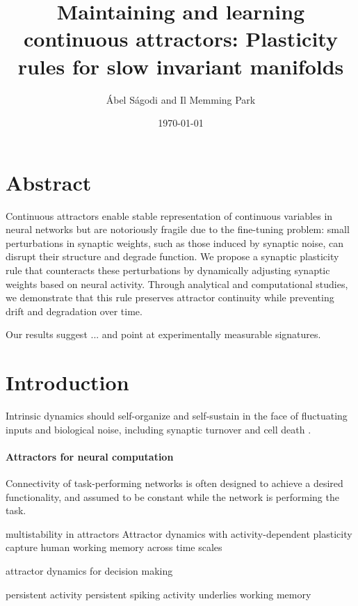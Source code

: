 \documentclass{article}
\title{Maintaining and learning continuous attractors: Plasticity rules for slow invariant manifolds} %
\author{\'Abel S\'agodi and Il Memming Park}
\date{\today}
\theoremstyle{definition} \newtheorem{definition}{Definition}
\theoremstyle{remark} \newtheorem{remark}{Remark}
\newcounter{ct}
\begin{document}
\maketitle

\section*{Abstract}
Continuous attractors enable stable representation of continuous variables in neural networks but are notoriously fragile due to the fine-tuning problem: small perturbations in synaptic weights, such as those induced by synaptic noise, can disrupt their structure and degrade function.
We propose a synaptic plasticity rule that counteracts these perturbations by dynamically adjusting synaptic weights based on neural activity.
Through analytical and computational studies, we demonstrate that this rule preserves attractor continuity while preventing drift and degradation over time.

Our results suggest ...
 and point at experimentally measurable signatures.



\section{Introduction}


Intrinsic dynamics should self-organize and self-sustain in the face of fluctuating inputs and biological noise, including synaptic turnover and cell death \citep{rolls2010noisybrain,Sagodi2024a}.




\paragraph{Attractors for neural computation}
Connectivity of task-performing networks is often designed to achieve a desired functionality, and assumed to be constant while the network is performing the task\citep{hopfield1982neural,benyishai1995theory}.

multistability in attractors \citep{braun2010attractors}
Attractor dynamics with activity-dependent plasticity capture human working memory across time scales \citep{brennan2023attractor}

attractor dynamics for decision making \citep{luo2023noncanonical}

persistent activity \citep{curtis2010beyond} \citep{bray2017persistence}
\citep{constantinidis2018persistent} persistent spiking activity underlies working memory
\end{document}
